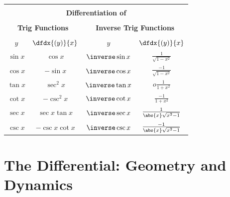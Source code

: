 \begin{center}
  \begin{tabular}{ |c|c||c|c| }
    \hline
    \multicolumn{4}{|c|}{} \\
    \multicolumn{4}{|c|}{\Large\bf{}Differentiation of } \\
    \multicolumn{4}{|c|}{} \\
    \multicolumn{2}{|c||}{\Large\bf{}Trig Functions}  & \multicolumn{2}{|c|}{\Large\bf{} Inverse Trig Functions} \\
    \multicolumn{2}{|c||}{} &    \multicolumn{2}{|c|}{} \\
    \hline
    $y$   &$\dfdx{(y)}{x}$      &$y$&$\dfdx{(y)}{x}$\\
    \hline\hline
    $\sin x$ &$ \cos x $        &$\inverse\sin x$ &
                                                    $\frac{1}{\sqrt{1-x^2}} $\\\hline
$\cos x$&$ -\sin x $& $\inverse\cos x$ & $\frac{-1}{\sqrt{1-x^2}}$ \\\hline
$\tan x$  & $\sec^2 x$      &$\inverse\tan x$&$o\frac{1}{1+ x^2}$\\\hline
$\cot x$  &$-\csc^2 x$      &$\inverse\cot x$&$\frac{-1}{1+
                                               x^2}$\\\hline
$\sec x$ &$ \sec x\tan x $&$\inverse\sec x$&$\frac{1}{\abs{x}\sqrt{x^2-1}}$\\\hline
$\csc x$  &$-\csc x\cot x $ &$\inverse\csc x$&$\frac{-1}{\abs{x}\sqrt{x^2-1}}$\\\hline
  \end{tabular}
\end{center}

\section{The Differential: Geometry and Dynamics}
\label{sec:visualizing-differentials}


